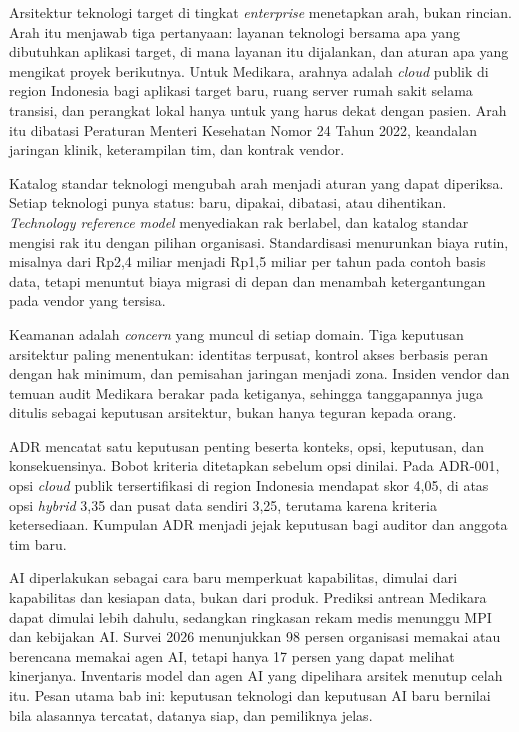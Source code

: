 Arsitektur teknologi target di tingkat \textit{enterprise} menetapkan arah,
bukan rincian. Arah itu menjawab tiga pertanyaan: layanan teknologi bersama
apa yang dibutuhkan aplikasi target, di mana layanan itu dijalankan, dan
aturan apa yang mengikat proyek berikutnya. Untuk Medikara, arahnya adalah
\textit{cloud} publik di region Indonesia bagi aplikasi target baru, ruang server
rumah sakit selama transisi, dan perangkat lokal hanya untuk yang harus dekat
dengan pasien. Arah itu dibatasi Peraturan Menteri Kesehatan Nomor 24 Tahun
2022, keandalan jaringan klinik, keterampilan tim, dan kontrak vendor.

Katalog standar teknologi mengubah arah menjadi aturan yang dapat diperiksa.
Setiap teknologi punya status: baru, dipakai, dibatasi, atau dihentikan.
\textit{Technology reference model} menyediakan rak berlabel, dan katalog
standar mengisi rak itu dengan pilihan organisasi. Standardisasi menurunkan
biaya rutin, misalnya dari Rp2,4 miliar menjadi Rp1,5 miliar per tahun pada
contoh basis data, tetapi menuntut biaya migrasi di depan dan menambah
ketergantungan pada vendor yang tersisa.

Keamanan adalah \textit{concern} yang muncul di setiap domain. Tiga keputusan
arsitektur paling menentukan: identitas terpusat, kontrol akses berbasis peran
dengan hak minimum, dan pemisahan jaringan menjadi zona. Insiden vendor dan
temuan audit Medikara berakar pada ketiganya, sehingga tanggapannya juga
ditulis sebagai keputusan arsitektur, bukan hanya teguran kepada orang.

ADR mencatat satu keputusan penting beserta konteks, opsi, keputusan, dan
konsekuensinya. Bobot kriteria ditetapkan sebelum opsi dinilai. Pada ADR-001,
opsi \textit{cloud} publik tersertifikasi di region Indonesia mendapat skor
4,05, di atas opsi \textit{hybrid} 3,35 dan pusat data sendiri 3,25, terutama
karena kriteria ketersediaan. Kumpulan ADR menjadi jejak keputusan bagi
auditor dan anggota tim baru.

AI diperlakukan sebagai cara baru memperkuat kapabilitas, dimulai dari
kapabilitas dan kesiapan data, bukan dari produk. Prediksi antrean Medikara
dapat dimulai lebih dahulu, sedangkan ringkasan rekam medis menunggu MPI dan
kebijakan AI. Survei 2026 menunjukkan 98 persen organisasi memakai atau
berencana memakai agen AI, tetapi hanya 17 persen yang dapat melihat
kinerjanya. Inventaris model dan agen AI yang dipelihara arsitek menutup
celah itu. Pesan utama bab ini: keputusan teknologi dan keputusan AI baru
bernilai bila alasannya tercatat, datanya siap, dan pemiliknya jelas.

